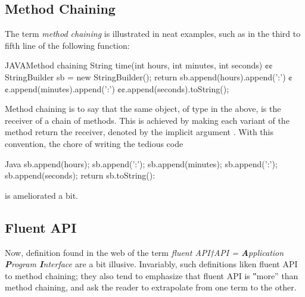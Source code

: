 \subsection{Method Chaining}
The term \emph{method chaining} is illustrated in neat examples, such
    as in the third to fifth line of the following \Java function:
\begin{lCode}{JAVA}{Method chaining}
String time(int hours, int minutes, int seconds) {¢¢
  StringBuilder sb = new StringBuilder();
  return sb.append(hours).append(':')
          ¢¢.append(minutes).append(':')
          ¢¢.append(seconds).toString();
}
\end{lCode}
Method chaining is to say that the same object,  of type  in the above,
   is the receiver of a chain of methods.
This is achieved by making each variant of the method  return the receiver, denoted by the
  implicit argument .
With this convention, the chore of writing the tedious code
\begin{lcode}{Java}
  sb.append(hours);
  sb.append(':');
  sb.append(minutes);
  sb.append(':');
  sb.append(seconds);
  return sb.toString():
\end{lcode}
is ameliorated a bit.

\subsection{Fluent API}
Now, definition found in the web of the term \emph{fluent API†{API =
    \textbf Application \textbf Program \textbf Interface
}} are a bit illusive.
Invariably, such definitions liken fluent API to method chaining;
  they also tend to emphasize that fluent API is ‟more” than method
  chaining, and ask the reader to extrapolate from one term to the other.

